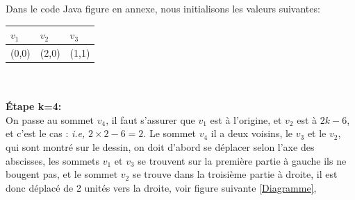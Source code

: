 \documentclass[hidelinks,letterpaper,12pt]{article}
\begin{document}
Dans le code Java figure en annexe, nous initialisons les valeurs suivantes: \\
\begin{tabularx}{\textwidth}{|*{3}{X|}}
\hline
$v_1$ & $v_2$ & $v_3$ \\
\hline
(0,0) & (2,0) & (1,1) \\
\hline
\end{tabularx}
\\ \\
\textbf{Étape k=4:}
\\
On passe au sommet $v_4$, il faut s'assurer que $v_1$ est à l'origine, et $v_2$ est à $2k-6$, et c'est le cas : \textit{i.e,} \( 2 \times 2-6 = 2 \).
Le sommet $v_4$ il a deux voisins, le $v_3$ et le $v_2$, qui sont montré sur le dessin, on doit d'abord se déplacer selon l'axe des abscisses, les sommets $v_1$ et $v_3$ se trouvent sur la première partie à gauche ils ne bougent pas, et le sommet $v_2$ se trouve dans la troisième partie à droite, il est donc déplacé de 2 unités vers la droite, voir figure suivante \ref{Diagramme},
\end{document}
